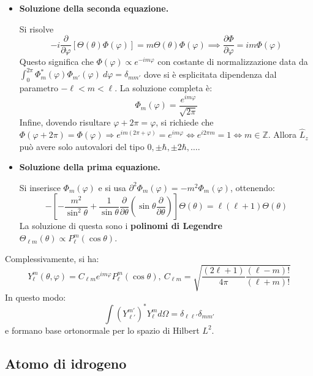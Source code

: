 \documentclass[10pt, a4paper]{scrartcl}
\numberwithin{equation}{subsection}
\theoremstyle{style2}
\theoremstyle{style1}
\begin{document}
\begin{itemize}
	\item \textbf{Soluzione della seconda equazione.} 

		Si risolve 
		\[
		-i \frac{\partial }{\partial \varphi } \left[ \Theta(\theta ) \Phi(\varphi ) \right] = m \Theta(\theta ) \Phi(\varphi ) \implies \frac{\partial \Phi}{\partial \varphi } = im \Phi (\varphi )
		\] 
		Questo significa che $\Phi(\varphi ) \propto e^{-im\varphi } $ con costante di normalizzazione data da $\int_{0} ^{2\pi} \Phi_m^*(\varphi ) \Phi_{m'} (\varphi ) \ d\varphi = \delta _{m m '} $ dove si \`e esplicitata dipendenza dal parametro $-\ell <m <\ell $. La soluzione completa \`e:
		\begin{equation}
			\Phi_m(\varphi ) = \frac{e^{im\varphi } }{\sqrt{2\pi} }
		\end{equation}
		Infine, dovendo risultare $\varphi  +2\pi = \varphi $, si richiede che $\Phi (\varphi + 2\pi ) = \Phi(\varphi ) \Rightarrow e^{im (2\pi + \varphi ) } = e^{im\varphi } \iff e^{i 2\pi m} = 1 \iff m \in \mathbb{Z}$. Allora $\hat{L}_z$ pu\`o avere solo autovalori del tipo $0, \pm\hbar , \pm 2 \hbar , \ldots$.
	\item \textbf{Soluzione della prima equazione.} 

		Si inserisce $\Phi_m(\varphi )$ e si usa $\partial^2 \Phi_m(\varphi ) =-m^2 \Phi_m(\varphi) $, ottenendo:
		\[
		- \left[ - \frac{m^2}{\sin^ 2 \theta } + \frac{1}{\sin\theta } \frac{\partial }{\partial \theta } \left(\sin \theta \frac{\partial }{\partial \theta } \right)  \right] \Theta(\theta ) = \ell (\ell +1) \Theta(\theta )
		\] 
		La soluzione di questa sono i \textbf{polinomi di Legendre} $\Theta_{\ell m} (\theta ) \propto P^m_\ell (\cos \theta ) $.
\end{itemize}
Complessivamente, si ha:
\begin{equation}
	Y^m_\ell (\theta ,\varphi ) = C_{\ell m}  e^{im \varphi } P^m_\ell (\cos \theta ), \ C_{\ell m} = \sqrt{\frac{(2\ell +1)}{4\pi} \frac{(\ell -m)!}{(\ell +m)!}} 
\end{equation}
In questo modo:
\[
\int (Y^{m'} _{\ell '} )^* Y^m_\ell  d \Omega  = \delta _{\ell \ell '} \delta _{m m'} 
\] 
e formano base ortonormale per lo spazio di Hilbert $L^2$.

\subsection{Atomo di idrogeno}
\end{document}
